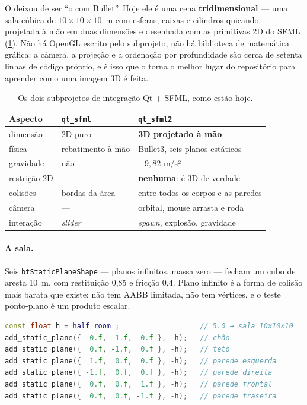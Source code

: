O  deixou de ser ``o  com Bullet''. Hoje ele
é uma cena \textbf{tridimensional} --- uma sala cúbica de $10 \times 10 \times
10$~m com esferas, caixas e cilindros quicando --- projetada à mão em duas
dimensões e desenhada com as primitivas 2D do SFML
(\cref{tab:qtsfml-comparacao}). Não há OpenGL escrito pelo subprojeto, não há
biblioteca de matemática gráfica: a câmera, a projeção e a ordenação por
profundidade são cerca de setenta linhas de código próprio, e é isso que o torna
o melhor lugar do repositório para aprender como uma imagem 3D é feita.

\begin{table}[htbp]
\centering
\caption{Os dois subprojetos de integração Qt + SFML, como estão hoje.}
\label{tab:qtsfml-comparacao}
\footnotesize
\begin{tabular}{@{}lll@{}}
\toprule
\textbf{Aspecto} & \texttt{qt\_sfml} & \texttt{qt\_sfml2} \\
\midrule
dimensão        & 2D puro                & \textbf{3D projetado à mão} \\
física          & rebatimento à mão      & Bullet3, seis planos estáticos \\
gravidade       & não                    & $-9{,}82$ m/s² \\
restrição 2D    & ---                    & \textbf{nenhuma}: é 3D de verdade \\
colisões        & bordas da área         & entre todos os corpos e as paredes \\
câmera          & ---                    & orbital, mouse arrasta e roda \\
interação       & \emph{slider}          & \emph{spawn}, explosão, gravidade \\
\bottomrule
\end{tabular}
\end{table}

\paragraph{A sala.} Seis \texttt{btStaticPlaneShape} --- planos infinitos, massa
zero --- fecham um cubo de aresta 10~m, com restituição 0,85 e fricção 0,4.
Plano infinito é a forma de colisão mais barata que existe: não tem AABB
limitada, não tem vértices, e o teste ponto-plano é um produto escalar.

\begin{lstlisting}[style=bt, language=C++,
    caption={A sala inteira em seis linhas --- \texttt{src/qt\_sfml2/physics\_world.cpp}.}]
const float h = half_room_;                   // 5.0 → sala 10x10x10
add_static_plane({  0.f,  1.f,  0.f }, -h);   // chão
add_static_plane({  0.f, -1.f,  0.f }, -h);   // teto
add_static_plane({  1.f,  0.f,  0.f }, -h);   // parede esquerda
add_static_plane({ -1.f,  0.f,  0.f }, -h);   // parede direita
add_static_plane({  0.f,  0.f,  1.f }, -h);   // parede frontal
add_static_plane({  0.f,  0.f, -1.f }, -h);   // parede traseira
\end{lstlisting}

